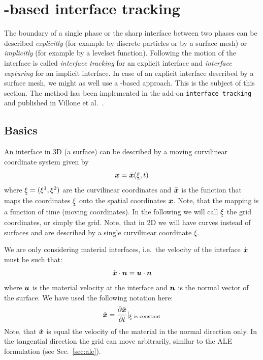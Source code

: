 
\def\headdate{26th June 2018}

\section{\fem-based interface tracking}
\label{sec:interface_tracking}

The boundary of a single phase or the sharp interface between two phases can
be described \emph{explicitly} (for example by discrete particles or by a
surface mesh) or \emph{implicitly} (for example by a levelset function).
Following the motion of the interface is called \emph{interface tracking}
for an explicit interface and \emph{interface capturing}
for an implicit interface. In case of an explicit interface described by a
surface mesh, we might as well use a \fem-based approach. This is the subject
of this section. The method has been implemented in the add-on
\texttt{interface\_tracking} and published in Villone et al.\ \cite{Villone2014}.

\subsection{Basics}
\label{sec:interface_tracking_basics}

An interface in 3D (a surface) can be described by
a moving curvilinear coordinate system given by
\begin{equation}
   \vek x = \bar{\vek x}(\col\xi,t)
    \label{eq:mappingxi_i}
\end{equation}
where $\col\xi=(\xi^1,\xi^2)$ are the curvilinear coordinates and
$\bar{\boldsymbol{x}}$ is the function that maps the coordinates $\col\xi$ onto the
spatial coordinates $\boldsymbol{x}$. Note, that the mapping is a function of time
(moving coordinates). 
In the following we will call $\col\xi$ the grid coordinates, or simply the
grid. Note, that in 2D we will have curves instead of surfaces and are
described by a single curvilinear coordinate $\xi$.

We are only considering material interfaces, i.e.\ the velocity of the
interface $\dot{\boldsymbol{x}}$ must be such that:
\begin{equation}
   \dot{\boldsymbol{x}}\cdot\boldsymbol{n}=\boldsymbol{u}\cdot\boldsymbol{n}
\end{equation}
where $\boldsymbol{u}$ is the material velocity at the interface and 
$\boldsymbol{n}$ is the normal vector of the surface. We have used
the following notation here:
\[
   \dot{\vek x}=\pderiv{\bar{\vek x}}{t}|_\text{$\col\xi$ is constant}
\]
Note, that $\dot{\boldsymbol{x}}$ is equal the velocity of the material in the normal
direction only. In the tangential direction the grid can move arbitrarily,
similar to the ALE formulation (see Sec.~\ref{sec:ale}).


